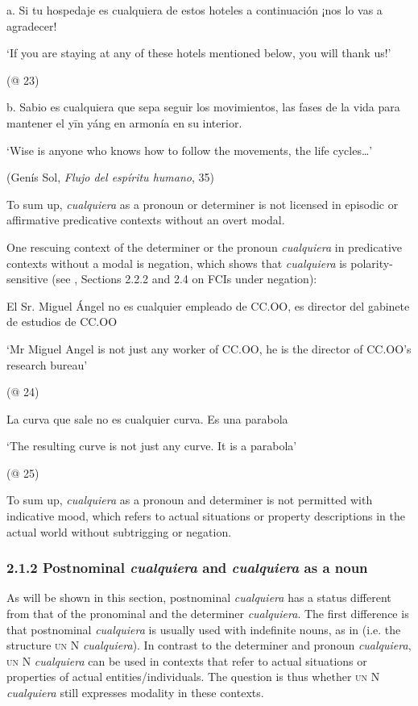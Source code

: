 \documentclass[output=paper]{langscibook}
\begin{document}
  \label{bkm:Ref57364726}a.  Si tu hospedaje es cualquiera de estos hoteles a continuación ¡nos lo vas a agradecer!

    ‘If you are staying at any of these hotels mentioned below, you will thank us!’

    (@ 23)

  b.  Sabio es cualquiera que sepa seguir los movimientos, las fases de la vida para mantener el yīn yáng en armonía en su interior.

    ‘Wise is anyone who knows how to follow the movements, the life cycles…’ 

    (Genís Sol, \textit{Flujo del espíritu humano}, 35)

To sum up, \textit{cualquiera} as a pronoun or determiner is not licensed in episodic or affirmative predicative contexts without an overt modal. 

  One rescuing context of the determiner or the pronoun \textit{cualquiera} in predicative contexts without a modal is negation, which shows that \textit{cualquiera} is polarity-sensitive (see \citealt{Chierchia2006}, Sections 2.2.2 and 2.4 on FCIs under negation):

  El Sr. Miguel Ángel no es cualquier empleado de CC.OO, es director del gabinete de estudios de CC.OO

  ‘Mr Miguel Angel is not just any worker of CC.OO, he is the director of CC.OO’s research bureau’

  (@ 24)

  La curva que sale no es cualquier curva. Es una parabola

  ‘The resulting curve is not just any curve. It is a parabola’

  (@ 25)

To sum up, \textit{cualquiera} as a pronoun and determiner is not permitted with indicative mood, which refers to actual situations or property descriptions in the actual world without subtrigging or negation.

\subsubsection{\textbf{2.1.2} \textbf{Postnominal} \textbf{\textit{cualquiera}}\textbf{ }\textbf{and} \textbf{\textit{cualquiera}} \textbf{as} \textbf{a} \textbf{noun}}

As will be shown in this section, postnominal \textit{cualquiera} has a status different from that of the pronominal and the determiner \textit{cualquiera}. The first difference is that postnominal \textit{cualquiera} is usually used with indefinite nouns, as in  (i.e. the structure \textsc{un} N \textit{cualquiera}). In contrast to the determiner and pronoun \textit{cualquiera}, \textsc{un} N \textit{cualquiera} can be used in contexts that refer to actual situations or properties of actual entities/individuals. The question is thus whether \textsc{un} N \textit{cualquiera} still expresses modality in these contexts.
\end{document}
